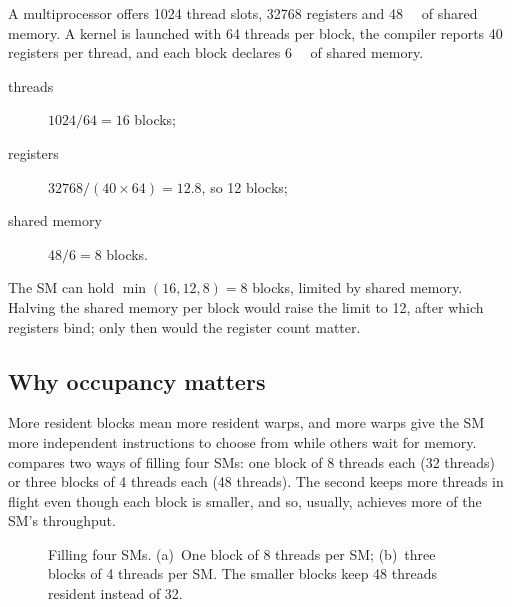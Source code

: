\documentclass[../main.tex]{subfiles}
\begin{document}
\begin{example}
  \label{ex:l03-blocks-per-sm}
  A multiprocessor offers 1024 thread slots, \num{32768} registers and
  \SI{48}{\kibi\byte} of shared memory.  A kernel is launched with 64
  threads per block, the compiler reports 40 registers per thread, and
  each block declares \SI{6}{\kibi\byte} of shared memory.
  \begin{description}
    \item[threads] $1024 / 64 = 16$ blocks;
    \item[registers] $\num{32768} / (40 \times 64) = 12.8$, so 12
      blocks;
    \item[shared memory] $48 / 6 = 8$ blocks.
  \end{description}
  The SM can hold $\min(16, 12, 8) = 8$ blocks, limited by shared
  memory.  Halving the shared memory per block would raise the limit to
  12, after which registers bind; only then would the register count
  matter.
\end{example}


\subsection{Why occupancy matters}

More resident blocks mean more resident warps, and more warps give the
SM more independent instructions to choose from while others wait for
memory.   compares two ways of filling four
SMs: one block of 8 threads each (32 threads) or three blocks of 4 threads
each (48 threads).  The second keeps more threads in flight even though
each block is smaller, and so, usually, achieves more of the SM's
throughput.

\begin{figure}[tb]
  \centering
  
  \caption{Filling four SMs.  (a)~One block of 8 threads per SM; (b)~three
    blocks of 4 threads per SM.  The smaller blocks keep 48 threads
    resident instead of 32.}
  \label{fig:l03-occupancy-cases}
\end{figure}
\end{document}
